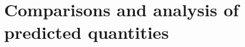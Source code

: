\documentclass[fleqn,usenatbib]{mnras}
\begin{document}

\section{Comparisons and analysis of predicted quantities}
\end{document}
